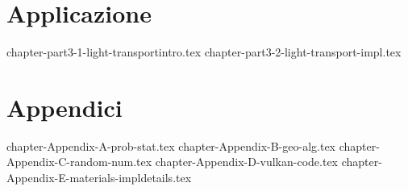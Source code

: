 \documentclass[12pt, openany]{book}
\theoremstyle{theoremdd}
\begin{document}
	\part{Applicazione}
	{chapter-part3-1-light-transportintro.tex}
	{chapter-part3-2-light-transport-impl.tex}

	\part{Appendici}
	\appendix
	{chapter-Appendix-A-prob-stat.tex}
	{chapter-Appendix-B-geo-alg.tex}
	{chapter-Appendix-C-random-num.tex}
	{chapter-Appendix-D-vulkan-code.tex}
	{chapter-Appendix-E-materials-impldetails.tex}

	\backmatter
	\printbibliography

	\printglossaries
\end{document}

